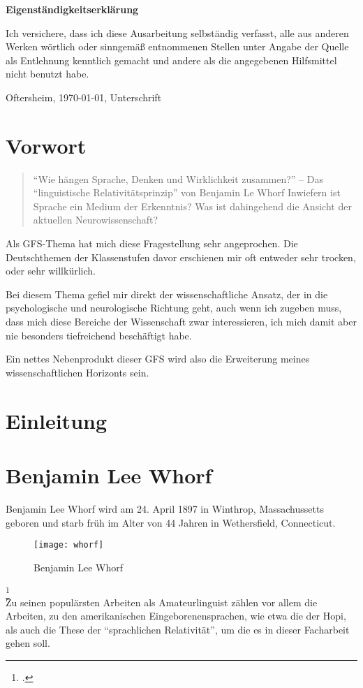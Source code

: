 \documentclass[12pt]{scrreprt}
\begin{document}
\makeititle
\begin{center}
	\sffamily\bfseries{Eigenständigkeitserklärung}
\end{center}
Ich versichere, dass ich diese Ausarbeitung selbständig verfasst, alle aus
anderen Werken wörtlich oder sinngemäß entnommenen Stellen unter Angabe der
Quelle als Entlehnung kenntlich gemacht und andere als die angegebenen
Hilfsmittel nicht benutzt habe.

Oftersheim, \today, Unterschrift
\tableofcontents
\listoffigures
\listoftables
\chapter{Vorwort}
	\label{chap:vorwort}
\blockquote{
\enquote{Wie hängen Sprache, Denken und Wirklichkeit
zusammen?} – Das \enquote{linguistische Relativitätsprinzip} von Benjamin Le
Whorf
\smallskip\newline
Inwiefern ist Sprache ein Medium der Erkenntnis?
Was ist dahingehend die Ansicht der aktuellen Neurowissenschaft?}
Als GFS-Thema hat mich diese Fragestellung sehr angeprochen.
Die Deutschthemen der Klassenstufen davor erschienen mir oft entweder sehr
trocken, oder sehr willkürlich.

Bei diesem Thema gefiel mir direkt der wissenschaftliche Ansatz, der in die
psychologische und neurologische Richtung geht, auch wenn ich zugeben muss, dass
mich diese Bereiche der Wissenschaft zwar interessieren, ich mich damit aber nie
besonders tiefreichend beschäftigt habe.

Ein nettes Nebenprodukt dieser GFS wird also die Erweiterung meines
wissenschaftlichen Horizonts sein.
\chapter{Einleitung}
\label{chap:einleitung}

\chapter{Benjamin Lee Whorf}
\label{chap:bjwhorf}
Benjamin Lee Whorf wird am 24. April 1897 in Winthrop, Massachussetts geboren
und starb früh im Alter von 44 Jahren in Wethersfield, Connecticut.
\begin{figure}[!htb]
	\centering
	\texttt{[image: whorf]}
	\caption[Benjamin Lee Whorf {\autocite{image:B_L_Whorf}}]{Benjamin Lee Whorf\footnotemark}
	\label{fig:whorf}
\end{figure}
\footcitetext{image:B_L_Whorf}\\
Zu seinen populärsten Arbeiten als Amateurlinguist zählen vor allem die Arbeiten,
zu den amerikanischen Eingeborenensprachen, wie etwa die der Hopi, als auch die
These der \enquote{sprachlichen Relativität}, um die es in dieser Facharbeit
gehen soll.
\end{document}

